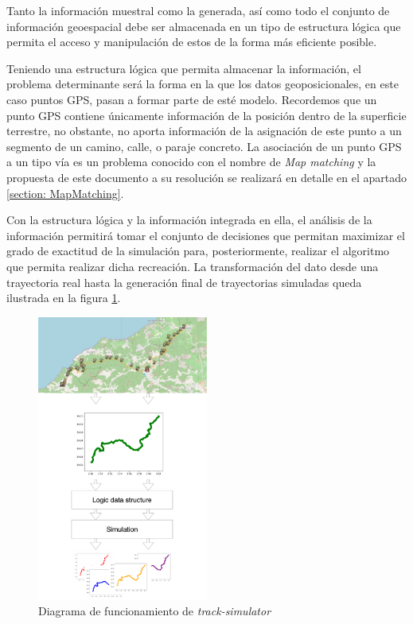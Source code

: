 Tanto la información muestral como la generada, así como todo el conjunto de 
información geoespacial debe ser almacenada en un tipo de estructura lógica que
permita el acceso y manipulación de estos de la forma más eficiente posible. 

Teniendo una estructura lógica que permita almacenar la información, el problema 
determinante será la forma en la que los datos geoposicionales, en este caso puntos 
\ac{GPS}, pasan a formar parte de esté modelo. Recordemos que un punto \ac{GPS} 
contiene únicamente información de la posición dentro de la superficie terrestre, no 
obstante, no aporta información de la asignación de este punto a un segmento de
un camino, calle, o paraje concreto. La asociación de un punto \ac{GPS} a un tipo vía es 
un problema conocido con el nombre de \textit{Map matching} y la propuesta de este 
documento a su resolución se realizará en detalle en el apartado \ref{section: 
MapMatching}.

Con la estructura lógica y la información integrada en ella, el análisis de la información 
permitirá tomar el conjunto de decisiones que permitan maximizar el grado de exactitud 
de la simulación para, posteriormente, realizar el algoritmo que permita realizar dicha 
recreación. La transformación del dato desde una trayectoria real hasta la generación 
final de trayectorias simuladas queda ilustrada en la figura 
\ref{figure:TrackSimulatorDiagram}.
\begin{figure}[!htb]
\begin{center}
\includegraphics[width=0.5\textwidth]{./Imagenes/Structure}
\caption{Diagrama de funcionamiento de \textit{track-simulator}}
\label{figure:TrackSimulatorDiagram}
\end{center}
\end{figure}
\newpage
 
